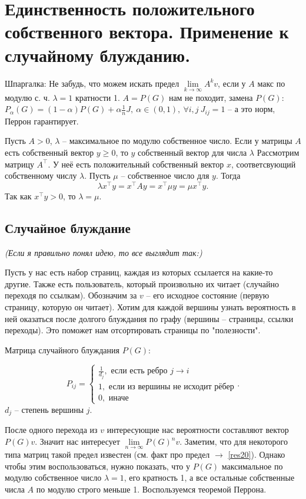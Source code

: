 \section{
 Единственность положительного собственного вектора. Применение к случайному блужданию.
}

Шпаргалка: Не забудь, что можем искать предел $\lim\limits_{k\to\infty}A^kv$, если у $ A $ макс по модулю с. ч. $\lambda=1$ кратности 1. $A=P(G)$ нам не походит, замена $P(G)$: $P_{\alpha}(G)=(1-\alpha) P(G) + \alpha\tfrac{1}{n}J,\ \alpha \in (0,1),\ \forall i,j\ J_{ij}=1 $ -- а это норм, Перрон гарантирует.

\lm Пусть $A>0$, $\lambda$ -- максимальное по модулю собственное число. Если у матрицы $A$ есть собственный вектор $y\geq 0$, то $y$ собственный вектор для числа $\lambda$
\elm
\proof Рассмотрим матрицу $A^{\top}$. У неё есть положительный  собственный вектор $x$, соответсвующий собственному числу $\lambda$. Пусть $\mu$ -- собственное число для $y$. Тогда 
$$\lambda x^{\top}y= x^{\top}Ay=x^{\top}\mu y=\mu x^{\top}y.$$
Так как $x^{\top}y >0$, то $\lambda=\mu$.
\endproof

\subsection*{Случайное блуждание}

\textit{(Если я правильно понял идею, то все выглядит так:)}

Пусть у нас есть набор страниц, каждая из которых ссылается на какие-то другие. Также есть пользователь, который произвольно их читает (случайно переходя по ссылкам). Обозначим за $v$ -- его исходное состояние (первую страницу, которую он читает). Хотим для каждой вершины узнать вероятность в ней оказаться после долгого блуждания по графу (вершины -- страницы, ссылки переходы). Это поможет нам отсортировать страницы по "полезности".

\dfn
  Матрица случайного блуждания  $P(G)$:

  $$ P_{ij}=\begin{cases}
  \frac{1}{d_j}, \text{ если есть ребро $j\to i$}\\
  1, \text{ если из вершины не исходит рёбер} \\
  0, \text{ иначе }
  \end{cases}. $$
  $d_j$ -- степень вершины $j$.
\edfn

После одного перехода из $v$ интересующие нас вероятности составляют вектор $P(G)v$. Значит нас интересует $\lim\limits_{n \to \infty}P(G)^nv$. Заметим, что для некоторого типа матриц такой предел известен (см. факт про предел $\rightarrow$ \ref{res20}). Однако чтобы этим воспользоваться, нужно показать, что у $P(G)$ максимальное по модулю собственное число $\lambda=1$, его кратность 1, а все остальные собственные числа $A$ по модулю строго меньше 1. Воспользуемся теоремой Перрона.


